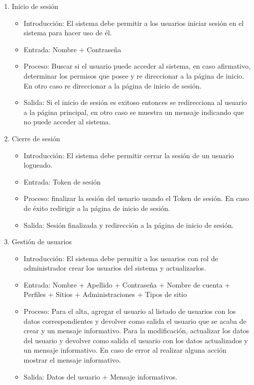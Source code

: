 		\begin{enumerate}
			\item Inicio de sesión
				\begin{itemize}
					\item Introducción: El sistema debe permitir a los usuarios iniciar sesión en el sistema para hacer uso de él.
					\item Entrada: Nombre + Contraseña
					\item Proceso: Buscar si el usuario puede acceder al sistema, en caso afirmativo, determinar los permisos que posee y re direccionar a la página de inicio. En otro caso re direccionar a la página de inicio de sesión.
					\item Salida: Si el inicio de sesión es exitoso entonces se redirecciona al usuario a la página principal, en otro caso se muestra un mensaje indicando que no puede acceder al sistema. 
				\end{itemize}
				
			\item Cierre de sesión
				\begin{itemize}
					\item Introducción: El sistema debe permitir cerrar la sesión de un usuario logueado.
					\item Entrada: Token de sesión
					\item Proceso: finalizar la sesión del usuario usando el Token de sesión. En caso de éxito redirigir a la página de inicio de sesión.
					\item Salida:	Sesión finalizada y redirección a la página de inicio de sesión.
				\end{itemize}
				
			\item Gestión de usuarios
				\begin{itemize}
					\item Introducción: El sistema debe permitir a los usuarios con rol de administrador crear los usuarios del sistema y actualizarlos.
					\item Entrada: Nombre + Apellido + Contraseña + Nombre de cuenta + Perfiles + Sitios + Administraciones + Tipos de sitio
					\item Proceso: Para el alta, agregar el usuario al listado de usuarios con los datos correspondientes y devolver como salida el usuario que se acaba de crear y un mensaje informativo. Para la modificación, actualizar los datos del usuario y devolver como salida el usuario con los datos actualizados y un mensaje informativo. En caso de error al realizar alguna acción mostrar el mensaje informativo.
					\item Salida: Datos del usuario + Mensaje informativos.
				\end{itemize}
				

\end{enumerate}
